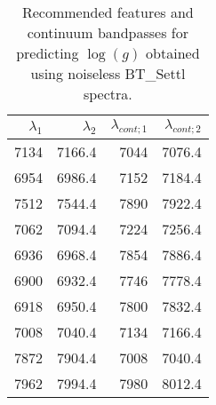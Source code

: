 \begin{table}
\begin{center}
\begin{tabular}{rrrr}
  \hline
  $\lambda_1$ & $\lambda_2$ & $\lambda_{cont;1}$ & $\lambda_{cont;2} $ \\ 
  \hline

7134 & 7166.4 &	7044 & 7076.4 \\
6954 & 6986.4 &	7152 & 7184.4 \\
7512 & 7544.4 &	7890 & 7922.4 \\
7062 & 7094.4 &	7224 & 7256.4 \\
6936 & 6968.4 &	7854 & 7886.4 \\
6900 & 6932.4 &	7746 & 7778.4 \\
6918 & 6950.4 &	7800 & 7832.4 \\
7008 & 7040.4 &	7134 & 7166.4 \\
7872 & 7904.4 &	7008 & 7040.4 \\
7962 & 7994.4 &	7980 & 8012.4 \\

\hline
\end{tabular}
\caption {Recommended features and continuum bandpasses for predicting $\log(g)$ 
      obtained using noiseless BT\_Settl spectra.} \label{tab:tab_SNRoo_G}
\end{center}
\end{table}

